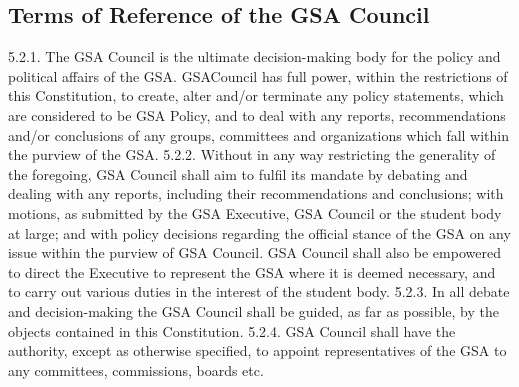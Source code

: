 \subsection{Terms of Reference of the GSA Council }
5.2.1. The GSA Council is the ultimate decision-making body for the policy 
and political affairs of the GSA. GSACouncil has full power, within 
the restrictions of this Constitution, to create, alter and/or terminate 
any policy statements, which are considered to be GSA Policy, and to 
deal with any reports, recommendations and/or conclusions of any 
groups, committees and organizations which fall within the purview of 
the GSA. 
5.2.2. Without in any way restricting the generality of the foregoing, GSA 
Council shall aim to fulfil its mandate by debating and dealing with 
any reports, including their recommendations and conclusions; with 
motions, as submitted by the GSA Executive, GSA Council or the 
student body at large; and with policy decisions regarding the official 
stance of the GSA on any issue within the purview of GSA Council. 
GSA Council shall also be empowered to direct the Executive to 
represent the GSA where it is deemed necessary, and to carry out 
various duties in the interest of the student body. 
5.2.3. In all debate and decision-making the GSA Council shall be guided, as 
far as possible, by the objects contained in this Constitution. 
5.2.4. GSA Council shall have the authority, except as otherwise specified, to 
appoint representatives of the GSA to any committees, commissions, 
boards etc.

